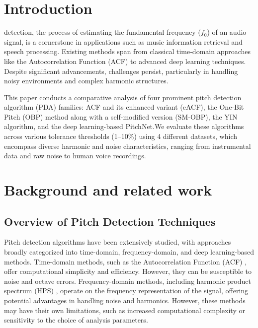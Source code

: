 \documentclass{ieeeaccess}
\begin{document}
\titlepgskip=-15pt

\maketitle
\section{Introduction}
\label{sec:introduction}
 detection, the process of estimating the fundamental frequency (\(f_0\)) of an audio signal, is a cornerstone in applications such as music information retrieval and speech processing. Existing methods span from classical time-domain approaches like the Autocorrelation Function (ACF) to advanced deep learning techniques. Despite significant advancements, challenges persist, particularly in handling noisy environments and complex harmonic structures.

This paper conducts a comparative analysis of four prominent pitch detection algorithm (PDA) families: ACF and its enhanced variant (eACF), the One-Bit Pitch (OBP) method along with a self-modified version (SM-OBP), the YIN algorithm, and the deep learning-based PitchNet.We evaluate these algorithms across various tolerance thresholds (1–10\%) using 4 different datasets, which encompass diverse harmonic and noise characteristics, ranging from instrumental data and raw noise to human voice recordings.

\section{Background and related work}
\subsection{Overview of Pitch Detection Techniques}
Pitch detection algorithms have been extensively studied, with approaches broadly categorized into time-domain, frequency-domain, and deep learning-based methods. Time-domain methods, such as the Autocorrelation Function (ACF) \cite{b3}, offer computational simplicity and efficiency. However, they can be susceptible to noise and octave errors. Frequency-domain methods, including harmonic product spectrum (HPS) \cite{b8}, operate on the frequency representation of the signal, offering potential advantages in handling noise and harmonics. However, these methods may have their own limitations, such as increased computational complexity or sensitivity to the choice of analysis parameters.
\end{document}
